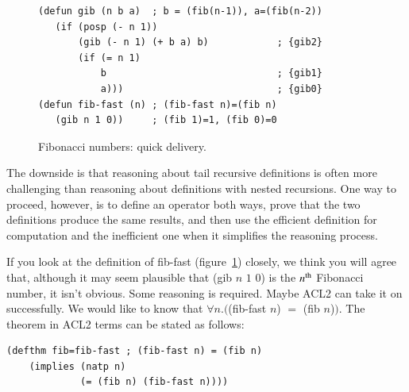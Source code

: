 \begin{figure}
\begin{center}
\begin{code}
\begin{verbatim}
(defun gib (n b a)  ; b = (fib(n-1)), a=(fib(n-2))
   (if (posp (- n 1))
       (gib (- n 1) (+ b a) b)            ; {gib2}
       (if (= n 1)
           b                              ; {gib1}
           a)))                           ; {gib0}
(defun fib-fast (n) ; (fib-fast n)=(fib n)
   (gib n 1 0))     ; (fib 1)=1, (fib 0)=0
\end{verbatim}
\end{code}
\end{center}
\caption{Fibonacci numbers: quick delivery.}
\label{fig:gib-defun}
\end{figure}

The downside is that reasoning
about tail recursive
definitions is often more challenging than reasoning about definitions
with nested recursions. One way to proceed, however,
is to define an operator both ways, prove that the two definitions
produce the same results, and then use the efficient definition
for computation and the inefficient one when it
simplifies the reasoning process.

If you look at the definition of \textsf{fib-fast} (figure~\ref{fig:gib-defun})
closely, we think you will agree that, although it may seem plausible
that \textsf{(gib $n$ $1$ $0$)} is the $n^\textnormal{th}$ Fibonacci number,
it isn't obvious.
Some reasoning is required.
Maybe ACL2 can take it on successfully.
We would like to know that $\forall n.($\textsf{(fib-fast $n$)} $=$ \textsf{(fib $n$)}$)$.
The theorem in ACL2 terms can be stated as follows:
\begin{center}
\begin{code}
\begin{verbatim}
(defthm fib=fib-fast ; (fib-fast n) = (fib n)
    (implies (natp n)
             (= (fib n) (fib-fast n))))
\end{verbatim}
\end{code}
\end{center}

